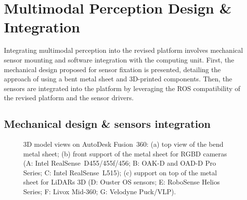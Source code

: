 \documentclass[letterpaper,10pt,conference]{IEEEtran} %
\begin{document}
\section{Multimodal Perception Design \& Integration}

Integrating multimodal perception into the revised platform
involves mechanical sensor mounting and software integration
with the computing unit. First, the mechanical design proposed for
sensor fixation is presented, detailing the approach of using a bent
metal sheet and 3D-printed components. Then, the sensors are integrated
into the platform by leveraging the ROS compatibility
of the revised platform and the sensor drivers.

\subsection{Mechanical design \& sensors integration}

\begin{figure}[t]
\centering
{}
\hspace{1em}
\hspace{1em}
\caption{3D model views on AutoDesk Fusion~360:
(a) top view of the bend metal sheet;
(b) front support of the metal sheet for RGBD cameras
(A: Intel RealSense~D455/455f/456;
B: OAK-D and OAD-D Pro Series;
C: Intel RealSense~L515);
(c) support on top of the metal sheet for LiDARs 3D
(D: Ouster OS sensors;
E: RoboSense Helios Series;
F: Livox Mid-360;
G: Velodyne Puck/VLP).}
\label{fig:fusion-360}
\end{figure}
\end{document}
